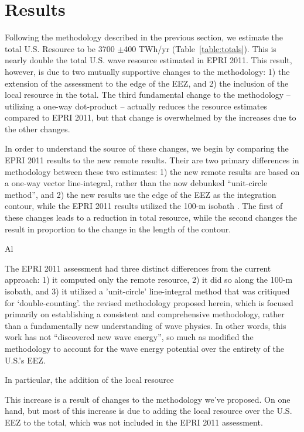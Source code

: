 \section{Results}

Following the methodology described in the previous section, we estimate the total U.S. Resource to be 3700 $\pm$400 TWh/yr (Table~\ref{table:totals}). This is nearly double the total U.S. wave resource estimated in EPRI 2011. This result, however, is due to two mutually supportive changes to the methodology: 1) the extension of the assessment to the edge of the EEZ, and 2) the inclusion of the local resource in the total. The third fundamental change to the methodology -- utilizing a one-way dot-product -- actually reduces the resource estimates compared to EPRI 2011, but that change is overwhelmed by the increases due to the other changes.

In order to understand the source of these changes, we begin by comparing the EPRI 2011 results to the new remote results. Their are two primary differences in methodology between these two estimates: 1) the new remote results are based on a one-way vector line-integral, rather than the now debunked ``unit-circle method'', and 2) the new results use the edge of the EEZ as the integration contour, while the EPRI 2011 results utilized the 100-m isobath .  The first of these changes leads to a reduction in total resource, while the second changes the result in proportion to the change in the length of the contour.

Al

The EPRI 2011 assessment had three distinct differences from the current approach: 1) it computed only the remote resource, 2) it did so along the 100-m isobath, and 3) it utilized a 'unit-circle' line-integral method that was critiqued for `double-counting'. 
the revised methodology proposed herein, which is focused primarily on establishing a consistent and comprehensive methodology, rather than a fundamentally new understanding of wave physics. In other words, this work has not ``discovered new wave energy'', so much as modified the methodology to account for the wave energy potential over the entirety of the U.S.'s EEZ.

In particular, the addition of the local resource 

This increase is a result of changes to the methodology we've proposed. On one hand, 
but most of this increase is due to adding the local resource over the U.S. EEZ to the total, which was not included in the EPRI 2011 assessment. 


